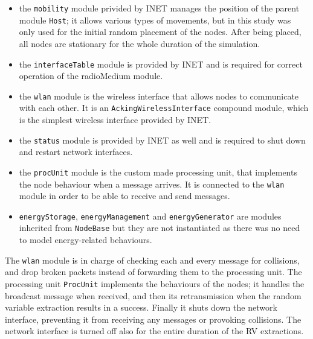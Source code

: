 \begin{itemize}
    \item the \texttt{mobility} module privided by INET manages the position of
    the parent module \texttt{Host}; it allows various types of movements, but
    in this study was only used for the initial random placement of the
    nodes. After being placed, all nodes are stationary for the whole duration of the simulation.
    \item the \texttt{interfaceTable} module is provided by INET and is required
    for correct operation of the radioMedium module.
    \item the \texttt{wlan} module is the wireless interface that allows nodes
    to communicate with each other. It is an \texttt{AckingWirelessInterface}
    compound module, which is the simplest wireless interface provided by INET.
    \item the \texttt{status} module is provided by INET as well and is required
    to shut down and restart network interfaces.
    \item the \texttt{procUnit} module is the custom made processing unit, that
    implements the node behaviour when a message arrives. It is connected to the
    \texttt{wlan} module in order to be able to receive and send messages.
    \item \texttt{energyStorage}, \texttt{energyManagement} and
    \texttt{energyGenerator} are modules inherited from \texttt{NodeBase} but
    they are not instantiated as there was no need to model energy-related
    behaviours.
\end{itemize}
The \texttt{wlan} module is in charge of checking each and every message for
collisions, and drop broken packets instead of forwarding them to the processing
unit. The processing unit \texttt{ProcUnit} implements the behaviours of the
nodes; it handles the broadcast message when received, and then its
retransmission when the random variable extraction results in a success. Finally
it shuts down the network interface, preventing it from receiving any messages
or provoking collisions. The network interface is turned off also for the entire
duration of the RV extractions.
